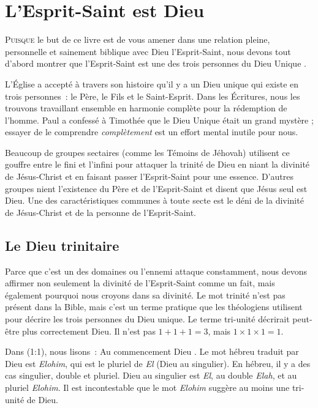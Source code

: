 \chapter{L'Esprit-Saint est Dieu}

\lettrine{P}{uisque} le but de ce livre est de vous amener
 dans une relation pleine, personnelle et sainement biblique avec
 Dieu l'Esprit-Saint, nous devons tout d'abord montrer que l'Esprit-Saint
 est une des trois personnes du Dieu Unique
 .

L'Église a accepté à travers son histoire qu'il y a un Dieu unique
 qui existe en trois personnes~: le Père, le Fils et le Saint-Esprit.
 Dans les Écritures, nous les trouvons travaillant ensemble en harmonie
 complète pour la rédemption de l'homme.
 Paul a confessé à Timothée que le Dieu Unique était un grand mystère ;
 essayer de le comprendre \emph{complètement} est un effort mental inutile
 pour nous.

Beaucoup de groupes sectaires (comme les Témoins de Jéhovah) utilisent
 ce gouffre entre le fini et l'infini pour attaquer la trinité de Dieu
 en niant la divinité de Jésus-Christ et en faisant passer l'Esprit-Saint
 pour une essence.
 D'autres groupes nient l'existence du Père et de l'Esprit-Saint et disent
 que Jésus seul est Dieu.
 Une des caractéristiques communes à toute secte est le déni de la divinité
 de Jésus-Christ et de la personne de l'Esprit-Saint.

\section{Le Dieu trinitaire}

Parce que c'est un des domaines ou l'ennemi attaque constamment, nous devons
 affirmer non seulement la divinité de l'Esprit-Saint comme un fait,
 mais également pourquoi nous croyons dans sa divinité.
 Le mot \og trinité \fg{} n'est pas présent dans la Bible, mais c'est un
 terme pratique que les théologiens utilisent pour décrire les trois personnes
 du Dieu unique.
 Le terme \og tri-unité \fg{} décrirait peut-être plus correctement Dieu.
 Il n'est pas $1 + 1 + 1 = 3$, mais $1 \times 1 \times 1 = 1$.

Dans (1:1), nous lisons~:
 \og Au commencement Dieu \fg{}.
 Le mot hébreu traduit par \og Dieu \fg{} est \emph{Elohim}, qui est
 le pluriel de \emph{El} (Dieu au singulier).
 En hébreu, il y a des cas singulier, double et pluriel.
 \og Dieu \fg{} au singulier est \emph{El}, au double \emph{Elah},
 et au pluriel \emph{Elohim}.
 Il est incontestable que le mot \emph{Elohim} suggère au moins
 une tri-unité de Dieu.

